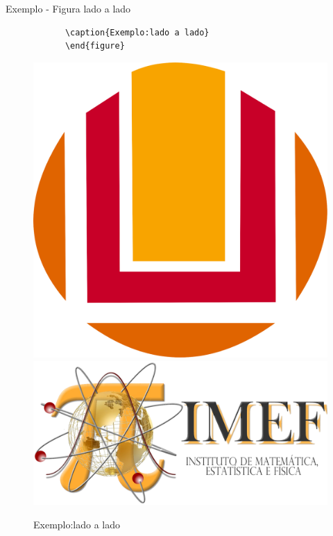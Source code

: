 \documentclass[c]{beamer}
\begin{document}
{\begin{frame}[fragile]{\sc Exemplo - Figura lado a lado}
\begin{verbatim}
			\caption{Exemplo:lado a lado}
			\end{figure}
\end{verbatim}
			\begin{figure}[H]
				\centering
				\includegraphics[scale=0.15]{images/furg.png}
				\includegraphics[scale=0.1]{images/imef2.png}
				\caption{Exemplo:lado a lado}
			\end{figure}
\end{frame}
		
}
\end{document}
